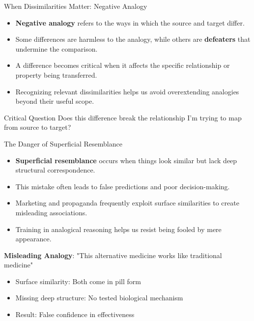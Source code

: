 \documentclass{beamer}
\begin{document}
	
	\begin{frame}{When Dissimilarities Matter: Negative Analogy}
		\begin{itemize}
			\item \textbf{Negative analogy} refers to the ways in which the source and target differ.
			\item Some differences are harmless to the analogy, while others are \textbf{defeaters} that undermine the comparison.
			\item A difference becomes critical when it affects the specific relationship or property being transferred.
			\item Recognizing relevant dissimilarities helps us avoid overextending analogies beyond their useful scope.
		\end{itemize}
		
		\begin{alertblock}{Critical Question}
			Does this difference break the relationship I'm trying to map from source to target?
		\end{alertblock}
	\end{frame}
	
	\begin{frame}{The Danger of Superficial Resemblance}
		\begin{itemize}
			\item \textbf{Superficial resemblance} occurs when things look similar but lack deep structural correspondence.
			\item This mistake often leads to false predictions and poor decision-making.
			\item Marketing and propaganda frequently exploit surface similarities to create misleading associations.
			\item Training in analogical reasoning helps us resist being fooled by mere appearance.
		\end{itemize}
		
		\begin{example}
			\textbf{Misleading Analogy}: "This alternative medicine works like traditional medicine"
			\begin{itemize}
				\item Surface similarity: Both come in pill form
				\item Missing deep structure: No tested biological mechanism
				\item Result: False confidence in effectiveness
			\end{itemize}
		\end{example}
	\end{frame}
	
\end{document}

